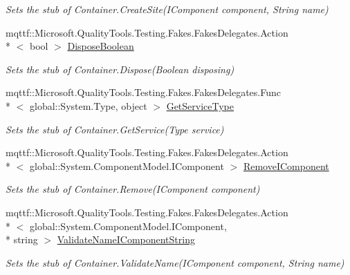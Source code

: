 \begin{DoxyCompactItemize}
\begin{DoxyCompactList}\small\item\em Sets the stub of Container.\-Create\-Site(\-I\-Component component, String name)\end{DoxyCompactList}\item 
mqttf\-::\-Microsoft.\-Quality\-Tools.\-Testing.\-Fakes.\-Fakes\-Delegates.\-Action\\*
$<$ bool $>$ \hyperlink{class_system_1_1_component_model_1_1_fakes_1_1_stub_container_a0ef075fdc5968e30a12acdc0d6c5935b}{Dispose\-Boolean}
\begin{DoxyCompactList}\small\item\em Sets the stub of Container.\-Dispose(\-Boolean disposing)\end{DoxyCompactList}\item 
mqttf\-::\-Microsoft.\-Quality\-Tools.\-Testing.\-Fakes.\-Fakes\-Delegates.\-Func\\*
$<$ global\-::\-System.\-Type, object $>$ \hyperlink{class_system_1_1_component_model_1_1_fakes_1_1_stub_container_a81580c55f5822c72b84cf20a802fa318}{Get\-Service\-Type}
\begin{DoxyCompactList}\small\item\em Sets the stub of Container.\-Get\-Service(\-Type service)\end{DoxyCompactList}\item 
mqttf\-::\-Microsoft.\-Quality\-Tools.\-Testing.\-Fakes.\-Fakes\-Delegates.\-Action\\*
$<$ global\-::\-System.\-Component\-Model.\-I\-Component $>$ \hyperlink{class_system_1_1_component_model_1_1_fakes_1_1_stub_container_a0379ab10d6436a4136723460610443c2}{Remove\-I\-Component}
\begin{DoxyCompactList}\small\item\em Sets the stub of Container.\-Remove(\-I\-Component component)\end{DoxyCompactList}\item 
mqttf\-::\-Microsoft.\-Quality\-Tools.\-Testing.\-Fakes.\-Fakes\-Delegates.\-Action\\*
$<$ global\-::\-System.\-Component\-Model.\-I\-Component, \\*
string $>$ \hyperlink{class_system_1_1_component_model_1_1_fakes_1_1_stub_container_a00876c2ed3594534373704c3c89470d8}{Validate\-Name\-I\-Component\-String}
\begin{DoxyCompactList}\small\item\em Sets the stub of Container.\-Validate\-Name(\-I\-Component component, String name)\end{DoxyCompactList}\end{DoxyCompactItemize}
